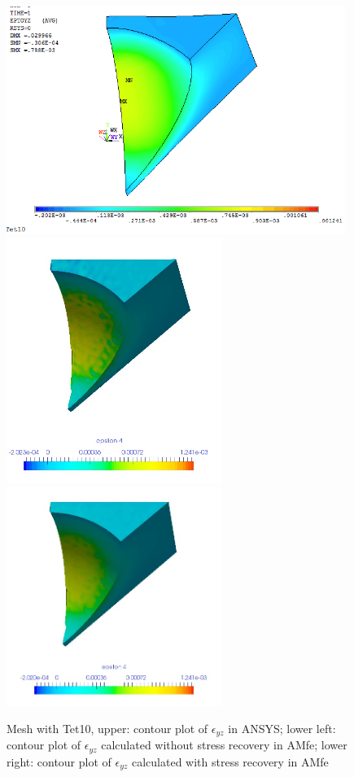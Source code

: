 \begin{figure}[htbp]
	\begin{center}
		\includegraphics[width=11cm,clip]{Tet10_Eyz.png} 	
		\includegraphics[width=7cm,clip]{Tet10_Eyz_PD.png} 	
		\includegraphics[width=7cm,clip]{Tet10_Eyz_P.png} 		
		\caption{Mesh with Tet10, upper: contour plot of $\epsilon_{yz}$ in ANSYS; lower left: contour plot of $\epsilon_{yz}$ calculated without stress recovery in AMfe; lower right: contour plot of $\epsilon_{yz}$ calculated with stress recovery in AMfe} \label{fig: Tet10_Eyz}
	\end{center}
\end{figure}
\clearpage 


